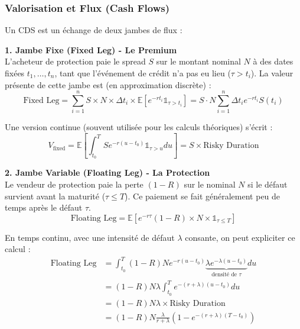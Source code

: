 \subsubsection{Valorisation et Flux (Cash Flows)}

Un CDS est un échange de deux jambes de flux :

\textbf{1. Jambe Fixe (Fixed Leg) - Le Premium} \\
L'acheteur de protection paie le spread $S$ sur le montant nominal $N$ à des dates fixées $t_1, \dots, t_n$, tant que l'événement de crédit n'a pas eu lieu ($\tau > t_i$).
La valeur présente de cette jambe est (en approximation discrète) :
\begin{equation}
    \text{Fixed Leg} = \sum_{i=1}^n S \times N \times \Delta t_i \times \mathbb{E}[e^{-r t_i} \mathbb{1}_{\tau > t_i}] = S \cdot N \sum_{i=1}^n \Delta t_i e^{-r t_i} S(t_i)
\end{equation}

Une version continue (souvent utilisée pour les calculs théoriques) s'écrit :
\begin{equation}
    V_{\text{fixed}} = \mathbb{E} \left[ \int_{t_0}^T S e^{-r(u-t_0)} \mathbb{1}_{\tau > u} du \right] = S \times \text{Risky Duration}
\end{equation}

\textbf{2. Jambe Variable (Floating Leg) - La Protection} \\
Le vendeur de protection paie la perte $(1-R)$ sur le nominal $N$ si le défaut survient avant la maturité ($\tau \le T$).
Ce paiement se fait généralement peu de temps après le défaut $\tau$.
\begin{equation}
    \text{Floating Leg} = \mathbb{E} \left[ e^{-r \tau} (1-R) \times N \times \mathbb{1}_{\tau \le T} \right]
\end{equation}

En temps continu, avec une intensité de défaut $\lambda$ consante, on peut expliciter ce calcul :
\begin{align}
    \text{Floating Leg} &= \int_{t_0}^T (1-R) N e^{-r(u-t_0)} \underbrace{\lambda e^{-\lambda(u-t_0)}}_{\text{densité de } \tau} du \\
    &= (1-R) N \lambda \int_{t_0}^T e^{-(r+\lambda)(u-t_0)} du \\
    &= (1-R) N \lambda \times \text{Risky Duration} \\
    &= (1-R) N \frac{\lambda}{r+\lambda} (1 - e^{-(r+\lambda)(T-t_0)})
\end{align}


